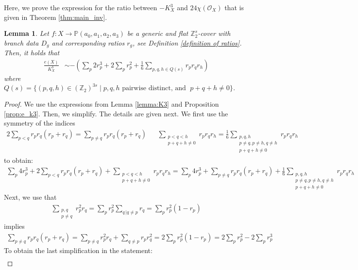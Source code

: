 \documentclass[12pt,twoside,]{amsart}
\theoremstyle{plain}
\newtheorem{lemma}[theorem]{Lemma}
\theoremstyle{definition}
\begin{document}
Here, we prove the expression for the ratio between $-K_X^3$ and $24 \chi\left( \mathcal{O}_X \right)$ that is given in Theorem \ref{thm:main_inv}.
\begin{lemma}
Let $f: X \rightarrow \mathbb{P}(a_0,a_1,a_2,a_3)$ be a generic and flat $\mathbb{Z}_2^s$-cover with branch data
$D_g$ and corresponding ratios $r_g$, see Definition \ref{definition of ratios}.
Then, it holds that
\begin{align*}
    \frac{e(X)}{K_X^3}
&\sim   
-
\left(
\sum_{p}2r_p^3 
+
2\sum_p r_p^2 
+
\frac{1}{6}
\sum_{p, q, h \in Q(s)}
r_pr_qr_h
\right)
\end{align*}
where 
$Q(s) = 
\{
(p,q,h) \in (\mathbb{Z}_2)^{3s}
\; | \;
p, q, h \text{ pairwise distinct, and }\;
p+q+h \neq 0 
\}$. 
\end{lemma}
\begin{proof}
We use the expressions from Lemma \ref{lemma:K3} and Proposition \ref{prop:e_k3}. Then, we simplify. The details are given next. 
We first use the symmetry of the indices 
\begin{align*}
2\sum_{p<q}r_p r_q(r_p+r_q)
=
\sum_{p \neq q}r_p r_q(r_p+r_q)
&&
\sum_{\substack{p < q < h \\ p+q+h \neq 0} }
r_pr_qr_h
=
\frac{1}{6}
\sum_{\substack{p, q, h \\ 
p \neq q, p \neq h, q\neq h 
\\ p+q+h \neq 0 } }
r_pr_qr_h
\end{align*}
to obtain:
\begin{align*}
   \sum_{p}4r_p^3 
+
2\sum_{p<q}r_p r_q(r_p+r_q)
+
\sum_{\substack{p < q <h \\ p+q+h \neq 0} }
r_pr_qr_h
=
   \sum_{p}4r_p^3 
+
\sum_{p \neq q}r_p r_q(r_p+r_q)
+
\frac{1}{6}
\sum_{\substack{p, q, h \\ 
p \neq q, p \neq h, q\neq h 
\\
p+q+h \neq 0} }
r_pr_qr_h
\end{align*}
Next, we use that
\begin{align*}
 \sum_{\substack{p,q \\ p \neq q}} r_p^2r_q  
 =
 \sum_p r_p^2\sum_{q \,|q \neq p}r_q
 =
  \sum_p r_p^2(1-r_p)
\end{align*}
implies
\begin{align*}
 \sum_{p \neq q}r_p r_q(r_p+r_q)
 =
\sum_{p \neq q}r_p^2 r_q
+
\sum_{q \neq p}r_p r_q^2
 =
2\sum_p r_p^2(1-r_p) 
=
2\sum_p r_p^2- 2 \sum_p r_p^3
\end{align*}
To obtain the last simplification in the statement:
\begin{align*}

\end{align*}
\end{proof}
\end{document}
